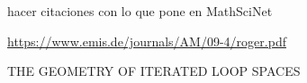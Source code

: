 \documentclass[TFM.tex]{subfiles}
\begin{document}
%


\begin{thebibliography}{}






 hacer citaciones con lo que pone en MathSciNet

 \url{https://www.emis.de/journals/AM/09-4/roger.pdf}





 THE GEOMETRY OF ITERATED LOOP SPACES
\cite{Hatcher}








\end{thebibliography}
\end{document}
